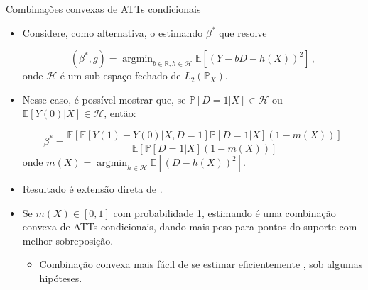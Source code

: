 \documentclass[11pt]{beamer}
\begin{document}
	\begin{frame}{Combinações convexas de ATTs condicionais}
		\begin{itemize}
			\item Considere, como alternativa, o estimando $\beta^*$ que resolve
			
			$$(\beta^*,g) = \operatorname{argmin}_{{b\in \mathbb{R}, h \in \mathcal{H}}} \mathbb{E}[(Y-bD - h(X))^2]\, ,$$
			onde $\mathcal{H}$ é um sub-espaço fechado de $L_2(\mathbb{P}_X)$.
			\item Nesse caso, é possível mostrar que, {\color{blue}se $\mathbb{P}[D=1|X]\in \mathcal{H}$ ou $\mathbb{E}[Y(0)|X] \in \mathcal{H}$}, então:
			
			$$\beta^* = \frac{\mathbb{E}[\mathbb{E}[Y(1)-Y(0)|X,D=1]\mathbb{P}[D=1|X](1-m(X)) ]}{\mathbb{E}[\mathbb{P}[D=1|X](1-m(X)) ]}$$
			onde $m(X) = \operatorname{argmin}_{h \in \mathcal{H}} \mathbb{E}[(D-h(X))^2]$.
			\item Resultado é extensão direta de \citet{Angrist1998}. \hyperlink{proof_angrist}{}
			\label{main}
			\item Se  $m(X) \in [0,1]$ com probabilidade 1, estimando é uma combinação convexa de ATTs condicionais, dando mais peso para pontos do suporte com melhor sobreposição.
			\begin{itemize}
				\item Combinação convexa mais fácil de se estimar eficientemente \citep{contaminationbias}, sob algumas hipóteses.
			\end{itemize}
		\end{itemize}
	\end{frame}
	
\end{document}
